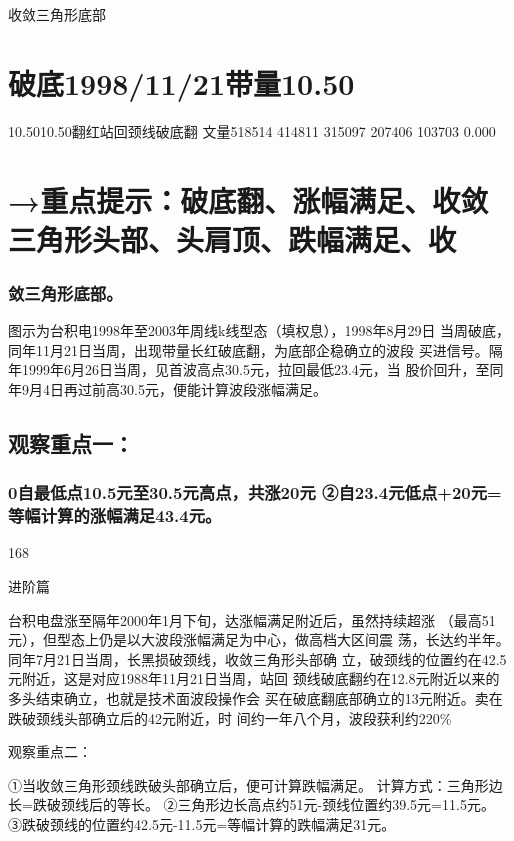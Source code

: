 \documentclass{article}
\begin{document}
收敛三角形底部

\section{破底1998/11/21带量10.50}

10.5010.50翻红站回颈线破底翻 文量518514 414811 315097 207406 103703 0.000

\section{→重点提示：破底翻、涨幅满足、收敛三角形头部、头肩顶、跌幅满足、收}

\subsubsection{敛三角形底部。}

图示为台积电1998年至2003年周线k线型态（填权息），1998年8月29日 当周破底，同年11月21日当周，出现带量长红破底翻，为底部企稳确立的波段 买进信号。隔年1999年6月26日当周，见首波高点30.5元，拉回最低23.4元，当 股价回升，至同年9月4日再过前高30.5元，便能计算波段涨幅满足。

\subsection{观察重点一：}

\subsubsection{0自最低点10.5元至30.5元高点，共涨20元 ②自23.4元低点+20元=等幅计算的涨幅满足43.4元。}

168

\clearpage

进阶篇

台积电盘涨至隔年2000年1月下旬，达涨幅满足附近后，虽然持续超涨 （最高51元），但型态上仍是以大波段涨幅满足为中心，做高档大区间震 荡，长达约半年。同年7月21日当周，长黑损破颈线，收敛三角形头部确 立，破颈线的位置约在42.5元附近，这是对应1988年11月21日当周，站回 颈线破底翻约在12.8元附近以来的多头结束确立，也就是技术面波段操作会 买在破底翻底部确立的13元附近。卖在跌破颈线头部确立后的42元附近，时 间约一年八个月，波段获利约220\%

观察重点二：

①当收敛三角形颈线跌破头部确立后，便可计算跌幅满足。 计算方式：三角形边长=跌破颈线后的等长。 ②三角形边长高点约51元-颈线位置约39.5元=11.5元。 ③跌破颈线的位置约42.5元-11.5元=等幅计算的跌幅满足31元。
\end{document}
